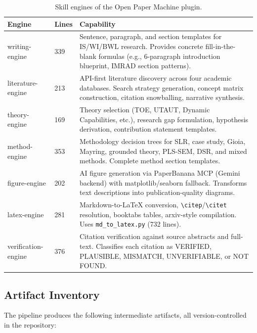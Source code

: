 \begin{table}[H]
\centering
\small
\caption{Skill engines of the Open Paper Machine plugin.}
\label{tab:skills}
\begin{tabular}{@{}llp{7.5cm}@{}}
\toprule
\textbf{Engine} & \textbf{Lines} & \textbf{Capability} \\
\midrule
writing-engine & 339 & Sentence, paragraph, and section templates for IS/WI/BWL research. Provides concrete fill-in-the-blank formulas (e.g., 6-paragraph introduction blueprint, IMRAD section patterns). \\
literature-engine & 213 & API-first literature discovery across four academic databases. Search strategy generation, concept matrix construction, citation snowballing, narrative synthesis. \\
theory-engine & 169 & Theory selection (TOE, UTAUT, Dynamic Capabilities, etc.), research gap formulation, hypothesis derivation, contribution statement templates. \\
method-engine & 353 & Methodology decision trees for SLR, case study, Gioia, Mayring, grounded theory, PLS-SEM, DSR, and mixed methods. Complete method section templates. \\
figure-engine & 202 & AI figure generation via PaperBanana MCP (Gemini backend) with matplotlib/seaborn fallback. Transforms text descriptions into publication-quality diagrams. \\
latex-engine & 281 & Markdown-to-LaTeX conversion, \texttt{\textbackslash citep}/\texttt{\textbackslash citet} resolution, booktabs tables, arxiv-style compilation. Uses \texttt{md\_to\_latex.py} (732 lines). \\
verification-engine & 376 & Citation verification against source abstracts and full-text. Classifies each citation as VERIFIED, PLAUSIBLE, MISMATCH, UNVERIFIABLE, or NOT FOUND. \\
\bottomrule
\end{tabular}
\end{table}

\subsection{Artifact Inventory}

The pipeline produces the following intermediate artifacts, all version-controlled in the repository:

